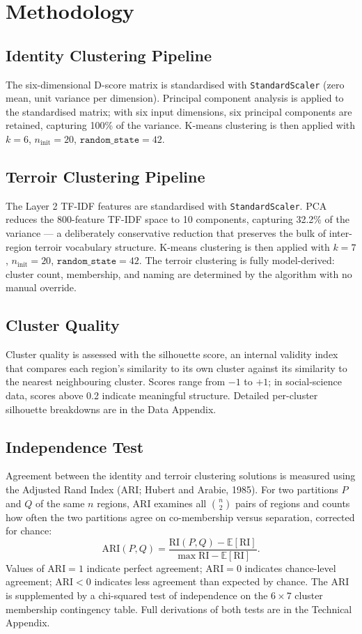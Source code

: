 \documentclass[11pt]{article}
\begin{document}
\section{Methodology}

\subsection{Identity Clustering Pipeline}
The six-dimensional D-score matrix is standardised with \texttt{StandardScaler} (zero mean, unit variance per dimension). Principal component analysis is applied to the standardised matrix; with six input dimensions, six principal components are retained, capturing 100\% of the variance. K-means clustering is then applied with $k = 6$, $n_\text{init} = 20$, $\texttt{random\_state} = 42$.

\subsection{Terroir Clustering Pipeline}
The Layer 2 TF-IDF features are standardised with \texttt{StandardScaler}. PCA reduces the 800-feature TF-IDF space to 10 components, capturing 32.2\% of the variance --- a deliberately conservative reduction that preserves the bulk of inter-region terroir vocabulary structure. K-means clustering is then applied with $k = 7$, $n_\text{init} = 20$, $\texttt{random\_state} = 42$. The terroir clustering is fully model-derived: cluster count, membership, and naming are determined by the algorithm with no manual override.

\subsection{Cluster Quality}
Cluster quality is assessed with the silhouette score, an internal validity index that compares each region's similarity to its own cluster against its similarity to the nearest neighbouring cluster. Scores range from $-1$ to $+1$; in social-science data, scores above 0.2 indicate meaningful structure. Detailed per-cluster silhouette breakdowns are in the Data Appendix.

\subsection{Independence Test}
Agreement between the identity and terroir clustering solutions is measured using the Adjusted Rand Index (ARI; Hubert and Arabie, 1985). For two partitions $P$ and $Q$ of the same $n$ regions, ARI examines all $\binom{n}{2}$ pairs of regions and counts how often the two partitions agree on co-membership versus separation, corrected for chance:
\[
\mathrm{ARI}(P, Q) = \frac{\mathrm{RI}(P, Q) - \mathbb{E}[\mathrm{RI}]}{\max \mathrm{RI} - \mathbb{E}[\mathrm{RI}]}.
\]
Values of $\mathrm{ARI} = 1$ indicate perfect agreement; $\mathrm{ARI} = 0$ indicates chance-level agreement; $\mathrm{ARI} < 0$ indicates less agreement than expected by chance. The ARI is supplemented by a chi-squared test of independence on the $6 \times 7$ cluster membership contingency table. Full derivations of both tests are in the Technical Appendix.
\end{document}
